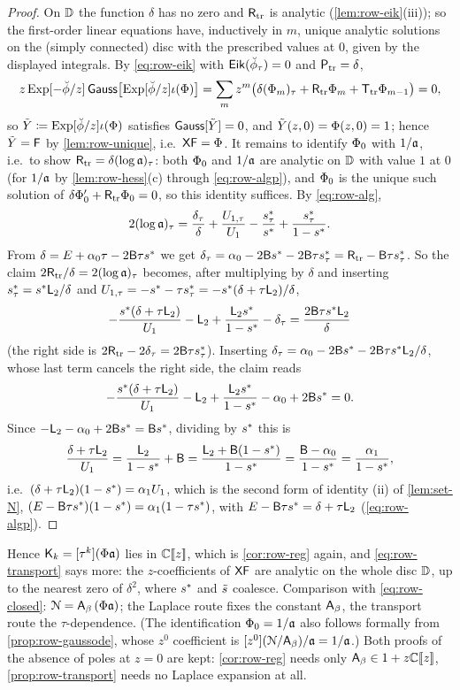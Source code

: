 \begin{proof}
On $\mathbb{D}$ the function $\delta$ has no zero and $\mathsf{R}_{\mathrm{tr}}$ is analytic (\cref{lem:row-eik}(iii)); so the first-order linear equations have, inductively in $m$, unique analytic solutions on the (simply connected) disc with the prescribed values at $0$, given by the displayed integrals. By \eqref{eq:row-eik} with $\mathsf{Eik}(\breve{\phi}_\tau)=0$ and $\mathsf{P}_{\mathrm{tr}}=\delta$,
\[
z\,\mathrm{Exp}[-\breve{\phi}/z]\,\mathsf{Gauss}\big[\mathrm{Exp}[\breve{\phi}/z]\iota(\Phi)\big]=\sum_mz^m\big(\delta(\Phi_m)_\tau+\mathsf{R}_{\mathrm{tr}}\Phi_m+\mathsf{T}_{\mathrm{tr}}\Phi_{m-1}\big)=0,
\]
so $\tilde Y\coloneqq\mathrm{Exp}[\breve{\phi}/z]\iota(\Phi)$ satisfies $\mathsf{Gauss}[\tilde Y]=0$, and $\tilde Y(z,0)=\Phi(z,0)=1$; hence $\tilde Y=\mathsf{F}$ by \cref{lem:row-unique}, i.e.\ $\mathsf{X}\mathsf{F}=\Phi$. It remains to identify $\Phi_0$ with $1/\mathfrak{a}$, i.e.\ to show $\mathsf{R}_{\mathrm{tr}}=\delta(\log\mathfrak{a})_\tau$: both $\Phi_0$ and $1/\mathfrak{a}$ are analytic on $\mathbb{D}$ with value $1$ at $0$ (for $1/\mathfrak{a}$ by \cref{lem:row-hess}(c) through \eqref{eq:row-algp}), and $\Phi_0$ is the unique such solution of $\delta\Phi_0'+\mathsf{R}_{\mathrm{tr}}\Phi_0=0$, so this identity suffices. By \eqref{eq:row-alg},
\[
2(\log\mathfrak{a})_\tau=\frac{\delta_\tau}{\delta}+\frac{U_{1,\tau}}{U_1}-\frac{s^{\ast}_\tau}{s^{\ast}}+\frac{s^{\ast}_\tau}{1-s^{\ast}}.
\]
From $\delta=E+\alpha_0\tau-2\mathsf{B}\tau s^{\ast}$ we get $\delta_\tau=\alpha_0-2\mathsf{B}s^{\ast}-2\mathsf{B}\tau s^{\ast}_\tau=\mathsf{R}_{\mathrm{tr}}-\mathsf{B}\tau s^{\ast}_\tau$. So the claim $2\mathsf{R}_{\mathrm{tr}}/\delta=2(\log\mathfrak{a})_\tau$ becomes, after multiplying by $\delta$ and inserting $s^{\ast}_\tau=s^{\ast}\mathsf{L}_2/\delta$ and $U_{1,\tau}=-s^{\ast}-\tau s^{\ast}_\tau=-s^{\ast}(\delta+\tau\mathsf{L}_2)/\delta$,
\[
-\frac{s^{\ast}(\delta+\tau\mathsf{L}_2)}{U_1}-\mathsf{L}_2+\frac{\mathsf{L}_2s^{\ast}}{1-s^{\ast}}-\delta_\tau=\frac{2\mathsf{B}\tau s^{\ast}\mathsf{L}_2}{\delta}
\]
(the right side is $2\mathsf{R}_{\mathrm{tr}}-2\delta_\tau=2\mathsf{B}\tau s^{\ast}_\tau$). Inserting $\delta_\tau=\alpha_0-2\mathsf{B}s^{\ast}-2\mathsf{B}\tau s^{\ast}\mathsf{L}_2/\delta$, whose last term cancels the right side, the claim reads
\[
-\frac{s^{\ast}(\delta+\tau\mathsf{L}_2)}{U_1}-\mathsf{L}_2+\frac{\mathsf{L}_2s^{\ast}}{1-s^{\ast}}-\alpha_0+2\mathsf{B}s^{\ast}=0 .
\]
Since $-\mathsf{L}_2-\alpha_0+2\mathsf{B}s^{\ast}=\mathsf{B}s^{\ast}$, dividing by $s^{\ast}$ this is
\[
\frac{\delta+\tau\mathsf{L}_2}{U_1}=\frac{\mathsf{L}_2}{1-s^{\ast}}+\mathsf{B}=\frac{\mathsf{L}_2+\mathsf{B}(1-s^{\ast})}{1-s^{\ast}}=\frac{\mathsf{B}-\alpha_0}{1-s^{\ast}}=\frac{\alpha_1}{1-s^{\ast}},
\]
i.e.\ $(\delta+\tau\mathsf{L}_2)(1-s^{\ast})=\alpha_1U_1$, which is the second form of identity (ii) of \cref{lem:set-N}, $(E-\mathsf{B}\tau s^{\ast})(1-s^{\ast})=\alpha_1(1-\tau s^{\ast})$, with $E-\mathsf{B}\tau s^{\ast}=\delta+\tau\mathsf{L}_2$ (\eqref{eq:row-algp}).
\end{proof}

Hence $\mathsf{K}_k=[\tau^k](\Phi\mathfrak{a})$ lies in $\mathbb{C}[\![ z ]\!]$, which is \cref{cor:row-reg} again, and \eqref{eq:row-transport} says more: the $z$-coefficients of $\mathsf{X}\mathsf{F}$ are analytic on the whole disc $\mathbb{D}$, up to the nearest zero of $\delta^2$, where $s^{\ast}$ and $\tilde{s}$ coalesce. Comparison with \eqref{eq:row-closed}: $\mathcal{N}=\mathsf{A}_{\beta}\,(\Phi\mathfrak{a})$; the Laplace route fixes the constant $\mathsf{A}_{\beta}$, the transport route the $\tau$-dependence. (The identification $\Phi_0=1/\mathfrak{a}$ also follows formally from \cref{prop:row-gaussode}, whose $z^0$ coefficient is $[z^0](\mathcal{N}/\mathsf{A}_{\beta})/\mathfrak{a}=1/\mathfrak{a}$.) Both proofs of the absence of poles at $z=0$ are kept: \cref{cor:row-reg} needs only $\mathsf{A}_{\beta}\in1+z\mathbb{C}[\![ z ]\!]$, \cref{prop:row-transport} needs no Laplace expansion at all.

